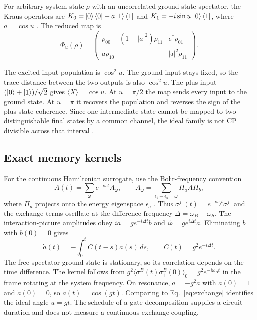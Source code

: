 \documentclass[
    pra,
    showpacs,
    groupedaddress,
    notitlepage,
    floatfix,
    nofootinbib
]{revtex4-2}
\begin{document}
\begin{samepage}
For arbitrary system state $\rho$ with an uncorrelated ground-state spectator, 
the Kraus operators are $K_0=\ket0\bra0+a\ket1\bra1$ and $K_1=-i\sin u\,\ket0\bra1$, where $a=\cos u$ \cite{nielsen}. The reduced map is
\begin{equation}
 \Phi_u(\rho)=
 \begin{pmatrix}
 \rho_{00}+(1-|a|^2)\rho_{11}&a^*\rho_{01}\\
 a\rho_{10}&|a|^2\rho_{11}
 \end{pmatrix}.
 \label{eq:channel}
\end{equation}
\end{samepage}
The excited-input population is $\cos^2u$. The ground input stays fixed, so the trace distance between the 
two outputs is also $\cos^2u$. The plus input $(\ket0+\ket1)/\sqrt2$ gives $\langle X\rangle=\cos u$. At $u=\pi/2$ 
the map sends every input to the ground state. At $u=\pi$ it recovers the population and reverses the sign of the plus-state coherence. 
Since one intermediate state cannot be mapped to two distinguishable final states by a common channel, the ideal family is not 
CP divisible across that interval \cite{rivas,blp}.

\subsection{Exact memory kernels}
For the continuous Hamiltonian surrogate, use the Bohr-frequency convention
\begin{equation}
 A(t)=\sum_\omega e^{-i\omega t}A_\omega,\qquad
 A_\omega=\sum_{\epsilon_b-\epsilon_a=\omega}\Pi_a A\Pi_b,
\end{equation}
where $\Pi_a$ projects onto the energy eigenspace $\epsilon_a$ \cite{breuer,lidar}. Thus $\sigma_-^j(t)=e^{-i\omega_jt}\sigma_-^j$ and the
exchange terms oscillate at the difference frequency $\Delta=\omega_B-\omega_S$. The interaction-picture amplitudes obey
$i\dot a=g e^{-i\Delta t}b$ and $i\dot b=g e^{i\Delta t}a$. Eliminating $b$ with $b(0)=0$ gives
\begin{equation}
 \dot a(t)=-\int_0^t C(t-s)a(s)\,ds,\qquad C(t)=g^2 e^{-i\Delta t}.
 \label{eq:volterra}
\end{equation}
The free spectator ground state is stationary, so its correlation depends on the time difference. The kernel follows from
$g^2\langle\sigma_-^B(t)\sigma_+^B(0)\rangle_0=g^2e^{-i\omega_Bt}$ in the frame rotating at the system frequency.
On resonance, $\ddot a=-g^2 a$ with $a(0)=1$ and $\dot a(0)=0$, so $a(t)=\cos(gt)$. Comparing to Eq.~\eqref{eq:exchange} identifies 
the ideal angle $u=gt$. The schedule of a gate decomposition supplies a circuit duration and does not measure a continuous exchange coupling.
\end{document}
